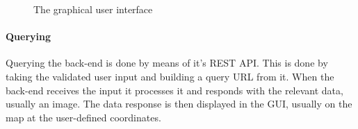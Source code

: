 \documentclass[11pt,a4paper,titlepage,oneside]{report}
\begin{document}
\begin{figure}[!htb]
\begin{center}
\caption{The graphical user interface}
\label{fig:gui}
\end{center}
\end{figure}

\paragraph{Querying}
Querying the \gls{back-end} is done by means of it's REST \gls{API}. This is done by taking the validated user input and building a query \gls{URL} from it. When the \gls{back-end} receives the input it processes it and responds with the relevant data, usually an image. The data response is then displayed in the \gls{GUI}, usually on the map at the user-defined coordinates. 
\end{document}
